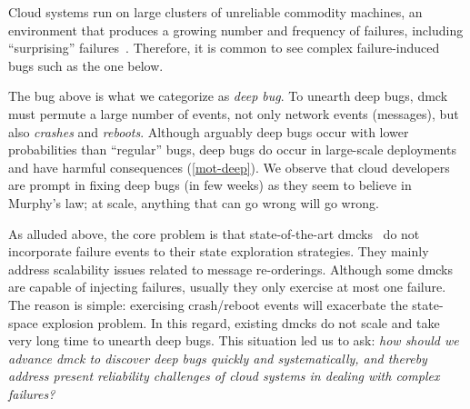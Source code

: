 Cloud systems run on large clusters of unreliable commodity machines,
an environment that produces a growing number and frequency of
failures, including ``surprising''
failures~\cite{Birman+09-CloudAgenda, Henry09-AmazonFUD}.  Therefore,
it is common to see complex failure-induced bugs such as the one
below.



The bug above is what we categorize as {\em deep bug}.  To unearth deep
bugs, dmck must permute a large number of events, not only network
events (messages), but also {\em crashes} and {\em reboots}.
Although arguably deep bugs occur with lower probabilities than
``regular'' bugs, deep bugs do occur in large-scale deployments and
have harmful consequences (\sec\ref{mot-deep}).  We observe that
cloud developers are prompt in fixing deep bugs (in few weeks) as they
seem to believe in Murphy's law; at scale, anything that can go wrong
will go wrong.



As alluded above, the core problem is that state-of-the-art 
dmcks~\cite{Guerraoui+11-McNoNetwork, Guo+11-Demeter,
  Killian+07-LifeDeathMaceMC, Simsa+10-Dbug, Yabandeh+09-CrystalBall,
  Yang+09-Modist} do not incorporate failure events to their state
exploration strategies.  They mainly address scalability issues
related to message re-orderings.  Although some dmcks are capable of
injecting failures, usually they only exercise at most one failure.
The reason is simple: exercising crash/reboot events will
exacerbate the state-space explosion problem.  In
this regard, existing dmcks do not scale and take very long
time to unearth deep bugs.  This situation led us to ask: {\it how
  should we advance dmck to discover deep bugs quickly and
  systematically, and thereby address present reliability challenges
  of cloud systems in dealing with complex failures?}


